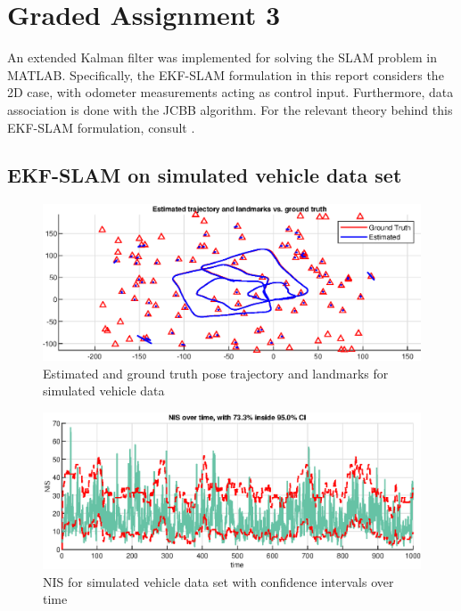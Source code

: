 \section{Graded Assignment 3}\label{sec:graded_assignment_3}


An extended Kalman filter was implemented for solving the SLAM problem in MATLAB. Specifically, the EKF-SLAM formulation in this report considers the 2D case, with odometer measurements acting as control input. Furthermore, data association is done with the JCBB algorithm. For the relevant theory behind this EKF-SLAM formulation, consult \cite[p. 185 - 196]{Edmund}.

\subsection{EKF-SLAM on simulated vehicle data set}

\begin{figure}[!htb]
    \centering
    \includegraphics[width=0.8\linewidth]{figures/ga_3/sim_trajectory.eps}
    \caption{Estimated and ground truth pose trajectory and landmarks for simulated vehicle data}
    \label{fig:ga_3_sim_trajectory}
\end{figure}

\begin{figure}[!htb]
    \centering
    \includegraphics[width=0.8\linewidth]{figures/ga_3/sim_NIS.eps}
    \caption{NIS for simulated vehicle data set with confidence intervals over time}
    \label{fig:ga_3_sim_NIS}
\end{figure}

